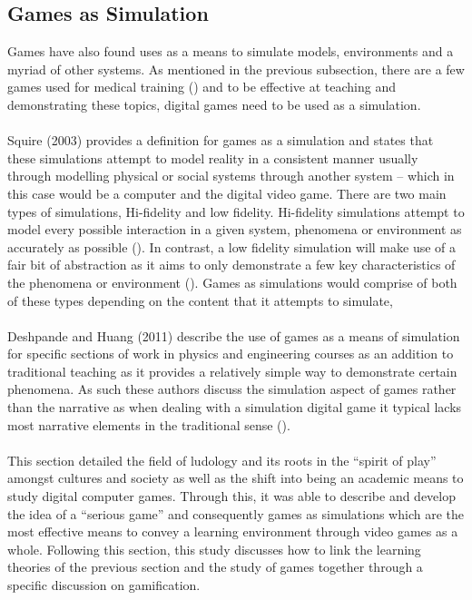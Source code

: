\subsection{Games as Simulation}
Games have also found uses as a means to simulate models, environments and a myriad of other systems. As mentioned in the previous subsection, there are a few games used for medical training (\cite{Burke2009}) and to be effective at teaching and demonstrating these topics, digital games need to be used as a simulation.
\\\\
Squire (2003) provides a definition for games as a simulation and states that these simulations attempt to model reality in a consistent manner usually through modelling physical or social systems through another system – which in this case would be a computer and the digital video game. There are two main types of simulations, Hi-fidelity and low fidelity. Hi-fidelity simulations attempt to model every possible interaction in a given system, phenomena or environment as accurately as possible (\cite{Squire2003}). In contrast, a low fidelity simulation will make use of a fair bit of abstraction as it aims to only demonstrate a few key characteristics of the phenomena or environment (\cite{Squire2003}). Games as simulations would comprise of both of these types depending on the content that it attempts to simulate,
\\\\
Deshpande and Huang (2011) describe the use of games as a means of simulation for specific sections of work in physics and engineering courses as an addition to traditional teaching as it provides a relatively simple way to demonstrate certain phenomena. As such these authors discuss the simulation aspect of games rather than the narrative as when dealing with a simulation digital game it typical lacks most narrative elements in the traditional sense (\cite{Deshpande2011}).
\\\\
This section detailed the field of ludology and its roots in the “spirit of play” amongst cultures and society as well as the shift into being an academic means to study digital computer games. Through this, it was able to describe and develop the idea of a “serious game” and consequently games as simulations which are the most effective means to convey a learning environment through video games as a whole. Following this section, this study discusses how to link the learning theories of the previous section and the study of games together through a specific discussion on gamification. 

